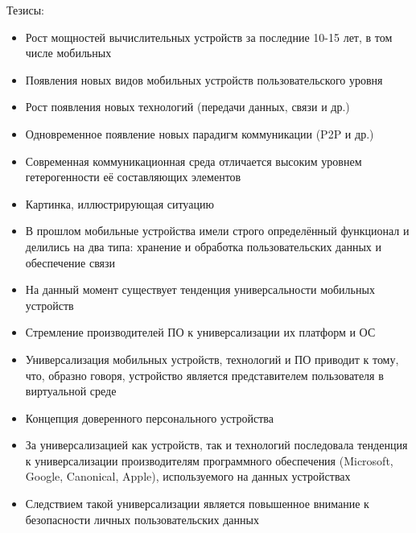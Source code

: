 \begin{remarks}
	Тезисы:
	\begin{itemize}
		\item Рост мощностей вычислительных устройств за последние 10-15 лет, в том числе мобильных
		\item Появления новых видов мобильных устройств пользовательского уровня
		\item Рост появления новых технологий (передачи данных, связи и др.)
		\item Одновременное появление новых парадигм коммуникации (P2P и др.)		
		\item Современная коммуникационная среда отличается высоким уровнем гетерогенности её 
			составляющих элементов
		\item Картинка, иллюстрирующая ситуацию

		\item В прошлом мобильные устройства имели строго определённый функционал и делились на два 
			типа: хранение и обработка пользовательских данных и обеспечение связи
		\item На данный момент существует тенденция универсальности мобильных устройств
		\item Стремление производителей ПО к универсализации их платформ и ОС
		
		\item Универсализация мобильных устройств, технологий и ПО приводит к тому, что, 
			образно говоря, устройство является представителем пользователя в виртуальной среде
		\item Концепция доверенного персонального устройства
			
		\item За универсализацией как устройств, так и технологий последовала тенденция к 
			универсализации производителям программного обеспечения (Microsoft, Google, Canonical, 
			Apple), используемого на данных устройствах
		\item Следствием такой универсализации является повышенное внимание к безопасности личных
			пользовательских данных
		

\end{itemize}
\end{remarks}
